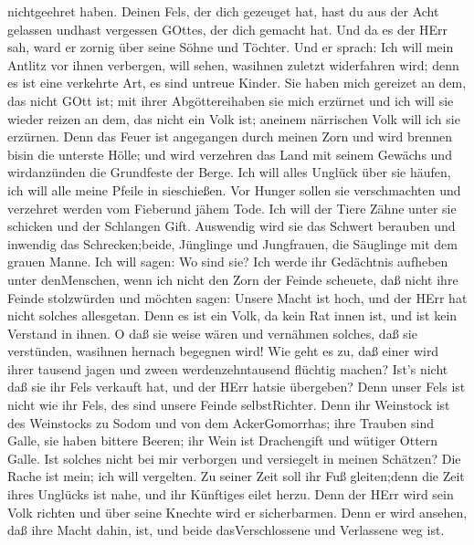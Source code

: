 nichtgeehret haben.  Deinen Fels, der dich gezeuget hat,
hast du aus der Acht gelassen undhast vergessen GOttes, der dich gemacht
hat.  Und da es der HErr sah, ward er zornig über seine
Söhne und Töchter.  Und er sprach: Ich will mein Antlitz
vor ihnen verbergen, will sehen, wasihnen zuletzt widerfahren wird; denn
es ist eine verkehrte Art, es sind untreue Kinder.  Sie
haben mich gereizet an dem, das nicht GOtt ist; mit ihrer
Abgöttereihaben sie mich erzürnet und ich will sie wieder reizen an dem,
das nicht ein Volk ist; aneinem närrischen Volk will ich sie erzürnen.
 Denn das Feuer ist angegangen durch meinen Zorn und wird
brennen bisin die unterste Hölle; und wird verzehren das Land mit seinem
Gewächs und wirdanzünden die Grundfeste der Berge.  Ich
will alles Unglück über sie häufen, ich will alle meine Pfeile in
sieschießen.  Vor Hunger sollen sie verschmachten und
verzehret werden vom Fieberund jähem Tode. Ich will der Tiere Zähne
unter sie schicken und der Schlangen Gift.  Auswendig wird
sie das Schwert berauben und inwendig das Schrecken;beide, Jünglinge und
Jungfrauen, die Säuglinge mit dem grauen Manne.  Ich will
sagen: Wo sind sie? Ich werde ihr Gedächtnis aufheben unter denMenschen,
 wenn ich nicht den Zorn der Feinde scheuete, daß nicht
ihre Feinde stolzwürden und möchten sagen: Unsere Macht ist hoch, und
der HErr hat nicht solches allesgetan.  Denn es ist ein
Volk, da kein Rat innen ist, und ist kein Verstand in ihnen.
 O daß sie weise wären und vernähmen solches, daß sie
verstünden, wasihnen hernach begegnen wird!  Wie geht es
zu, daß einer wird ihrer tausend jagen und zween werdenzehntausend
flüchtig machen? Ist's nicht daß sie ihr Fels verkauft hat, und der HErr
hatsie übergeben?  Denn unser Fels ist nicht wie ihr Fels,
des sind unsere Feinde selbstRichter.  Denn ihr Weinstock
ist des Weinstocks zu Sodom und von dem AckerGomorrhas; ihre Trauben
sind Galle, sie haben bittere Beeren;  ihr Wein ist
Drachengift und wütiger Ottern Galle.  Ist solches nicht
bei mir verborgen und versiegelt in meinen Schätzen?  Die
Rache ist mein; ich will vergelten. Zu seiner Zeit soll ihr Fuß
gleiten;denn die Zeit ihres Unglücks ist nahe, und ihr Künftiges eilet
herzu.  Denn der HErr wird sein Volk richten und über seine
Knechte wird er sicherbarmen. Denn er wird ansehen, daß ihre Macht
dahin, ist, und beide dasVerschlossene und Verlassene weg ist.
